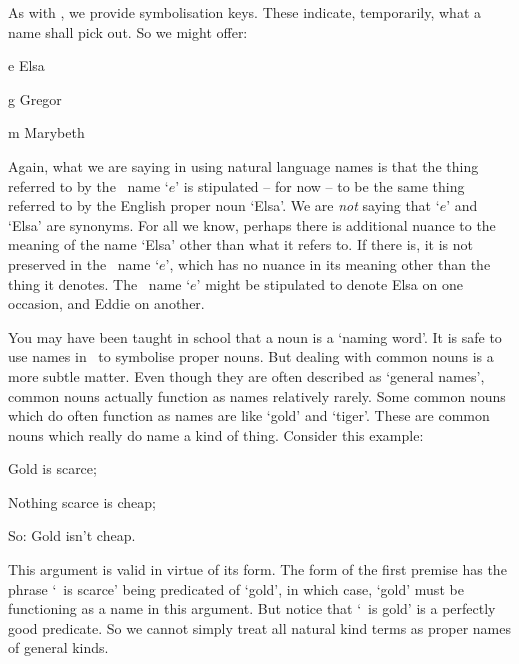 As with \TFL, we provide symbolisation keys. These indicate, temporarily, what a name shall pick out. So we might offer:
	\begin{ekey}
		\item[e] Elsa
		\item[g] Gregor
		\item[m] Marybeth
	\end{ekey}

Again, what we are saying in using natural language names is that the thing referred to by the \FOL\ name `$e$' is stipulated – for now – to be the same thing referred to by the English proper noun `Elsa'. We are \emph{not} saying that `$e$' and `Elsa' are synonyms. For all we know, perhaps there is additional nuance to the meaning of the name `Elsa' other than what it refers to. If there is, it is not preserved in the \FOL\ name `$e$', which has no nuance in its meaning other than the thing it denotes. The \FOL\ name `$e$' might be stipulated to denote Elsa on one occasion, and Eddie on another. 

You may have been taught in school that a noun is a `naming word'. It is safe to use names in \FOL\ to symbolise proper nouns. But dealing with common nouns  is a more subtle matter. Even though they are often described as `general names', common nouns actually function as names relatively rarely. Some common nouns which do often function as names are  like `gold' and `tiger'. These are common nouns which really do name a kind of thing. Consider this example: \begin{earg}
	\item[] Gold is scarce;
	\item[] Nothing scarce is cheap;
	\item[So:] Gold isn't cheap.
\end{earg} This argument is valid in virtue of its form. The form of the first premise has the phrase `\blank\ is scarce' being predicated of `gold', in which case, `gold' must be functioning as a name in this argument. But notice that `\blank\ is gold' is a perfectly good predicate. So we cannot simply treat all natural kind terms as proper names of general kinds.

